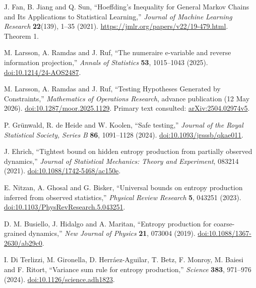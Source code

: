 J. Fan, B. Jiang and Q. Sun,
``Hoeffding's Inequality for General Markov Chains and Its Applications to Statistical Learning,''
\emph{Journal of Machine Learning Research} \textbf{22}(139), 1--35 (2021).
\url{https://jmlr.org/papers/v22/19-479.html}. Theorem 1.

M. Larsson, A. Ramdas and J. Ruf,
``The numeraire e-variable and reverse information projection,''
\emph{Annals of Statistics} \textbf{53}, 1015--1043 (2025).
\href{https://doi.org/10.1214/24-AOS2487}{doi:10.1214/24-AOS2487}.

M. Larsson, A. Ramdas and J. Ruf,
``Testing Hypotheses Generated by Constraints,''
\emph{Mathematics of Operations Research}, advance publication (12 May 2026).
\href{https://doi.org/10.1287/moor.2025.1129}{doi:10.1287/moor.2025.1129}.
Primary text consulted: \href{https://arxiv.org/abs/2504.02974v5}{arXiv:2504.02974v5}.

P. Gr\"unwald, R. de Heide and W. Koolen,
``Safe testing,''
\emph{Journal of the Royal Statistical Society, Series B}
\textbf{86}, 1091--1128 (2024).
\href{https://doi.org/10.1093/jrsssb/qkae011}{doi:10.1093/jrsssb/qkae011}.

J. Ehrich,
``Tightest bound on hidden entropy production from partially observed dynamics,''
\emph{Journal of Statistical Mechanics: Theory and Experiment}, 083214 (2021).
\href{https://doi.org/10.1088/1742-5468/ac150e}{doi:10.1088/1742-5468/ac150e}.

E. Nitzan, A. Ghosal and G. Bisker,
``Universal bounds on entropy production inferred from observed statistics,''
\emph{Physical Review Research} \textbf{5}, 043251 (2023).
\href{https://doi.org/10.1103/PhysRevResearch.5.043251}{doi:10.1103/PhysRevResearch.5.043251}.

D. M. Busiello, J. Hidalgo and A. Maritan,
``Entropy production for coarse-grained dynamics,''
\emph{New Journal of Physics} \textbf{21}, 073004 (2019).
\href{https://doi.org/10.1088/1367-2630/ab29c0}{doi:10.1088/1367-2630/ab29c0}.

I. Di Terlizzi, M. Gironella, D. Herr\'aez-Aguilar, T. Betz,
F. Monroy, M. Baiesi and F. Ritort,
``Variance sum rule for entropy production,''
\emph{Science} \textbf{383}, 971--976 (2024).
\href{https://doi.org/10.1126/science.adh1823}{doi:10.1126/science.adh1823}.

